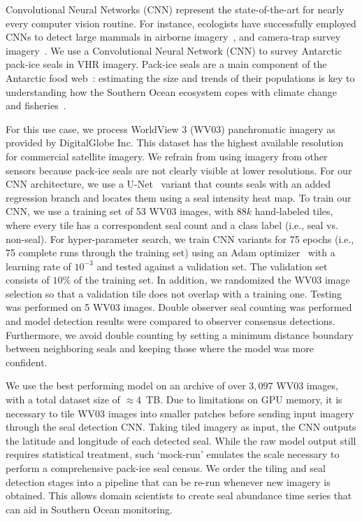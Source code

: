 
Convolutional Neural Networks (CNN) represent the state-of-the-art for nearly every computer vision routine.
For instance, ecologists have successfully employed CNNs to detect large mammals in airborne imagery~\cite{kellenberger2018detecting,polzounov2016right}, and camera-trap survey imagery~\cite{norouzzadeh2018automatically}.
We use a Convolutional Neural Network (CNN) to survey Antarctic pack-ice seals in VHR imagery.
Pack-ice seals are a main component of the Antarctic food web~\cite{fabra2008convention}: estimating the size and trends of their populations is key to understanding how the Southern Ocean ecosystem copes with climate change~\cite{hillebrand2018climate} and fisheries~\cite{reid2019climate}.

For this use case, we process WorldView 3 (WV03) panchromatic imagery as provided by DigitalGlobe Inc.
This dataset has the highest available resolution for commercial satellite imagery.
We refrain from using imagery from other sensors because pack-ice seals are not clearly visible at lower resolutions.
For our CNN architecture, we use a U-Net~\cite{ronneberger2015u} variant that counts seals with an added regression branch and locates them using a seal intensity heat map.
To train our CNN, we use a training set of 53 WV03 images, with $88k$ hand-labeled tiles, where every tile has a correspondent seal count and a class label (i.e., seal vs. non-seal).
For hyper-parameter search, we train CNN variants for 75 epochs (i.e., 75 complete runs through the training set) using an Adam optimizer~\cite{kingma2014adam} with a learning rate of $10^{-3}$ and tested against a validation set.
The validation set consists of $10\%$ of the training set.
In addition, we randomized the WV03 image selection so that a validation tile does not overlap with a training one.
Testing was performed on 5 WV03 images.
Double observer seal counting was performed and model detection results were compared to observer consensus detections.
Furthermore, we avoid double counting by setting a minimum distance boundary between neighboring seals and keeping those where the model was more confident.

We use the best performing model on an archive of over $3,097$ WV03 images, with a total dataset size of $\approx4$~TB.
Due to limitations on GPU memory, it is necessary to tile WV03 images into smaller patches before sending input imagery through the seal detection CNN.
Taking tiled imagery as input, the CNN outputs the latitude and longitude of each detected seal.
While the raw model output still requires statistical treatment, such `mock-run' emulates the scale necessary to perform a comprehensive pack-ice seal census.
We order the tiling and seal detection stages into a pipeline that can be re-run whenever new imagery is obtained.
This allows domain scientists to create seal abundance time series that can aid in Southern Ocean monitoring.

